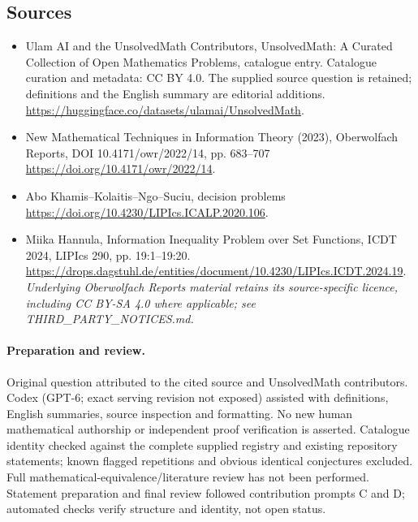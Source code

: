 \documentclass[11pt]{article}
\begin{document}
\subsection{Sources}
\begin{itemize}
\item[\hypertarget{source:statement:1}{S1}] Ulam AI and the UnsolvedMath Contributors, UnsolvedMath: A Curated Collection of Open Mathematics Problems, catalogue entry. Catalogue curation and metadata: CC BY 4.0. The supplied source question is retained; definitions and the English summary are editorial additions.
\url{https://huggingface.co/datasets/ulamai/UnsolvedMath}.
\item[\hypertarget{source:statement:2}{S2}] New Mathematical Techniques in Information Theory (2023), Oberwolfach Reports, DOI 10.4171/owr/2022/14, pp. 683--707
\url{https://doi.org/10.4171/owr/2022/14}.
\item[\hypertarget{source:statement:3}{S3}] Abo Khamis--Kolaitis--Ngo--Suciu, decision problems
\url{https://doi.org/10.4230/LIPIcs.ICALP.2020.106}.
\item[\hypertarget{source:statement:4}{S4}] Miika Hannula, Information Inequality Problem over Set Functions, ICDT 2024, LIPIcs 290, pp. 19:1--19:20.
\url{https://drops.dagstuhl.de/entities/document/10.4230/LIPIcs.ICDT.2024.19}.
\textit{Underlying Oberwolfach Reports material retains its source-specific licence, including CC BY-SA 4.0 where applicable; see THIRD\_PARTY\_NOTICES.md.}
\end{itemize}
\paragraph{Preparation and review.}
Original question attributed to the cited source and UnsolvedMath contributors. Codex (GPT-6; exact serving revision not exposed) assisted with definitions, English summaries, source inspection and formatting. No new human mathematical authorship or independent proof verification is asserted. Catalogue identity checked against the complete supplied registry and existing repository statements; known flagged repetitions and obvious identical conjectures excluded. Full mathematical-equivalence/literature review has not been performed. Statement preparation and final review followed contribution prompts C and D; automated checks verify structure and identity, not open status.
\label{end:statement}
\end{document}
